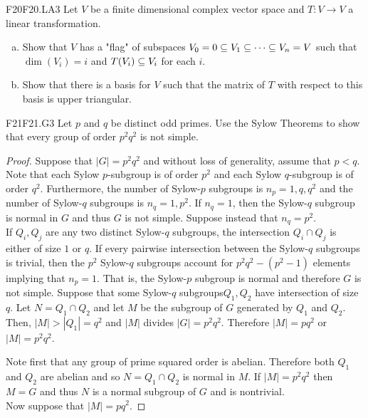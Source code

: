 \documentclass[../AlgebraQualSolutions.tex]{subfiles}
\begin{document}
	\begin{prob}{F20}{F20.LA3}
	Let $V$ be a finite dimensional complex vector space and $T: V \to V$ a linear transformation.
	\begin{enumerate}[(a)]
	\item Show that $V$ has a "flag" of subspaces $V_0 = 0 \subseteq V_1 \subseteq \cdots \subseteq V_n = V$ such that $\dim(V_i) = i$ and $T(V_i) \subseteq V_i$ for each $i$.
	\item Show that there is a basis for $V$ such that the matrix of $T$ with respect to this basis is upper triangular.
	\end{enumerate}
	\end{prob}
	

	
	\begin{prob}{F21}{F21.G3}
	Let $p$ and $q$ be distinct odd primes. Use the Sylow Theorems to show that every group of order $p^2q^2$ is not simple.
	\end{prob}	
	
	\begin{proof}
	Suppose that $|G| = p^2q^2$ and without loss of generality, assume that $p < q$. Note that each Sylow $p$-subgroup is of order $p^2$ and each Sylow $q$-subgroup is of order $q^2$. Furthermore, the number of Sylow-$p$ subgroups is $n_p = 1, q, q^2$ and the number of Sylow-$q$ subgroups is $n_q = 1, p^2$. If $n_q = 1$, then the Sylow-$q$ subgroup is normal in $G$ and thus $G$ is not simple. Suppose instead that $n_q = p^2$.\\
	
	If $Q_i, Q_j$ are any two distinct Sylow-$q$ subgroups, the intersection $Q_i \cap Q_j$ is either of size $1$ or $q$. If every pairwise intersection between the Sylow-$q$ subgroups is trivial, then the $p^2$ Sylow-$q$ subgroups account for $p^2q^2 - (p^2 -1)$ elements implying that $n_p = 1$. That is, the Sylow-$p$ subgroup is normal and therefore $G$ is not simple. Suppose that some Sylow-$q$ subgroups$Q_1, Q_2$ have intersection of size $q$. Let $N = Q_1 \cap Q_2$ and let $M$ be the subgroup of $G$ generated by $Q_1$ and $Q_2$. Then, $|M| > |Q_1| = q^2$ and $|M|$ divides $|G| = p^2q^2$. Therefore $|M| = pq^2$ or $|M| = p^2 q^2$. 
	
Note first that any group of prime squared order is abelian. Therefore both $Q_1$ and $Q_2$ are abelian and so $N = Q_1 \cap Q_2$ is normal in $M$. If $|M| = p^2q^2$ then $M=G$ and thus $N$ is a normal subgroup of $G$ and is nontrivial.\\

Now suppose that $|M| = pq^2$. 
	\end{proof}
	
\end{document}
